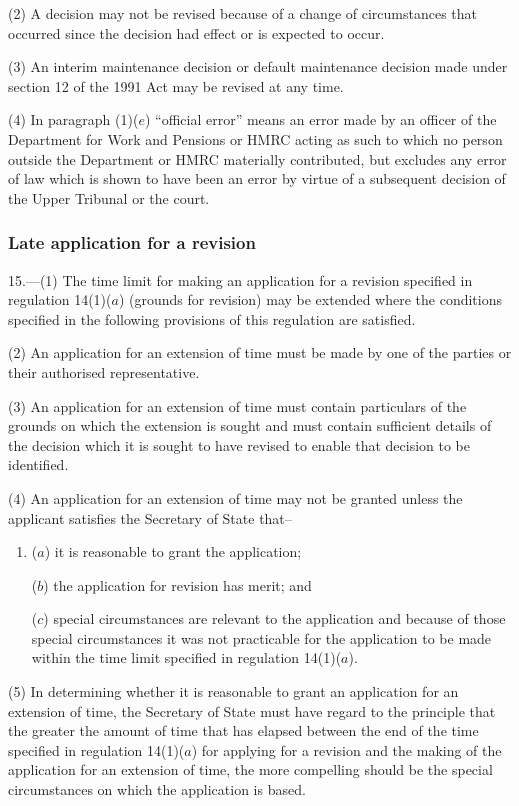 \documentclass[12pt,a4paper]{article}
\begin{document}
(2) A decision may not be revised because of a change of circumstances that occurred since the decision had effect or is expected to occur.

(3) An interim maintenance decision or default maintenance decision made under section 12 of the 1991 Act may be revised at any time.

(4) In paragraph (1)($e$)  “official error” means an error made by an officer of the Department for Work and Pensions or HMRC acting as such to which no person outside the Department or HMRC materially contributed, but excludes any error of law which is shown to have been an error by virtue of a subsequent decision of the Upper Tribunal or the court.

\subsubsection[15. Late application for a revision]{Late application for a revision}

15.---(1)  The time limit for making an application for a revision specified in regulation 14(1)($a$)  (grounds for revision) may be extended where the conditions specified in the following provisions of this regulation are satisfied.

(2) An application for an extension of time must be made by one of the parties or their authorised representative.

(3) An application for an extension of time must contain particulars of the grounds on which the extension is sought and must contain sufficient details of the decision which it is sought to have revised to enable that decision to be identified.

(4) An application for an extension of time may not be granted unless the applicant satisfies the Secretary of State that–
\begin{enumerate}\item[]
($a$) it is reasonable to grant the application;

($b$) the application for revision has merit; and

($c$) special circumstances are relevant to the application and because of those special circumstances it was not practicable for the application to be made within the time limit specified in regulation 14(1)($a$).
\end{enumerate}

(5) In determining whether it is reasonable to grant an application for an extension of time, the Secretary of State must have regard to the principle that the greater the amount of time that has elapsed between the end of the time specified in regulation 14(1)($a$)  for applying for a revision and the making of the application for an extension of time, the more compelling should be the special circumstances on which the application is based.
\end{document}
